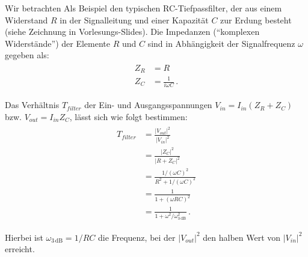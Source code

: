 Wir betrachten Als Beispiel den typischen RC-Tiefpassfilter, der aus einem Widerstand $R$ in der Signalleitung und einer Kapazität $C$ zur Erdung besteht (siehe Zeichnung in Vorlesungs-Slides). Die Impedanzen (``komplexen Widerst\"ande'') der Elemente $R$ und $C$ sind in Abh\"angigkeit der Signalfrequenz $\omega$ gegeben als:
\begin{align}
    \begin{split}
        Z_R &= R\\
        Z_C &= \frac{1}{i \omega C}\,.
        \label{eq:vl10-4}
    \end{split}
\end{align}

Das Verh\"altnis $T_{filter}$ der Ein- und Ausgangsspannungen $V_{in} = I_{in} (Z_R + Z_C)$ bzw. $V_{out} = I_{in} Z_C$, l\"asst sich wie folgt bestimmen:
\begin{align}
    \begin{split}
        T_{filter} &= \frac{|V_{out}|^2}{|V_{in}|^2}\\
        &= \frac{|Z_C|^2}{|R + Z_C|^2}\\
        &= \frac{1/(\omega C)^2}{R^2 + 1/(\omega C)^2}\\
        &= \frac{1}{1 + (\omega R C)^2}\\
        &= \frac{1}{1 + \omega^2 / \omega_{3\,\text{dB}}^2}\,.
        \label{eq:vl10-5}
    \end{split}
\end{align}

Hierbei ist $\omega_{3\,\text{dB}} = 1/RC$ die Frequenz, bei der $|V_{out}|^2$ den halben Wert von $|V_{in}|^2$ erreicht.\\[0.3 cm]




